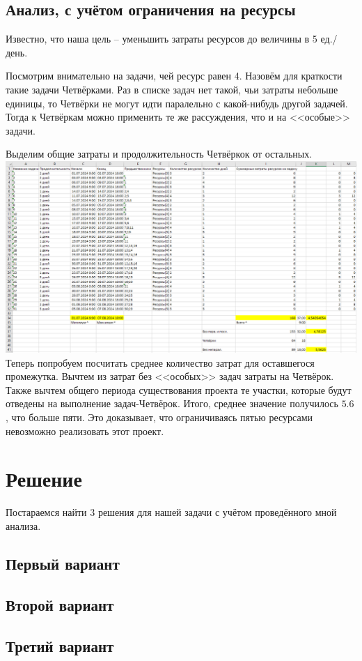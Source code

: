 \documentclass[14pt]{article}
\begin{document}
	\subsection{Анализ, с учётом ограничения на ресурсы}
		Известно, что наша цель -- уменьшить затраты ресурсов до величины в 5 ед./день.
		
		Посмотрим внимательно на задачи, чей ресурс равен 4.
		Назовём для краткости такие задачи Четвёрками.
		Раз в списке задач нет такой, чьи затраты небольше единицы, то Четвёрки не могут идти паралельно с какой-нибудь другой задачей.
		Тогда к Четвёркам можно применить те же рассуждения, что и на <<особые>> задачи.
		
		Выделим общие затраты и продолжительность Четвёркок от остальных.\\
		\includegraphics[width=\textwidth]{../img/1a3_time_estimation.png}\\ 
		
		Теперь попробуем посчитать среднее количество затрат для оставшегося промежутка.
		Вычтем из затрат без <<особых>> задач затраты на Четвёрок.
		Также вычтем общего периода существования проекта те участки, которые будут отведены на выполнение задач-Четвёрок.
		Итого, среднее значение получилось $5.6$, что больше пяти.
		Это доказывает, что ограничиваясь пятью ресурсами невозможно реализовать этот проект.
\section{Решение}
	Постараемся найти 3 решения для нашей задачи с учётом проведённого мной анализа.
	\subsection{Первый вариант}
	\subsection{Второй вариант}
	\subsection{Третий вариант}
\end{document}
